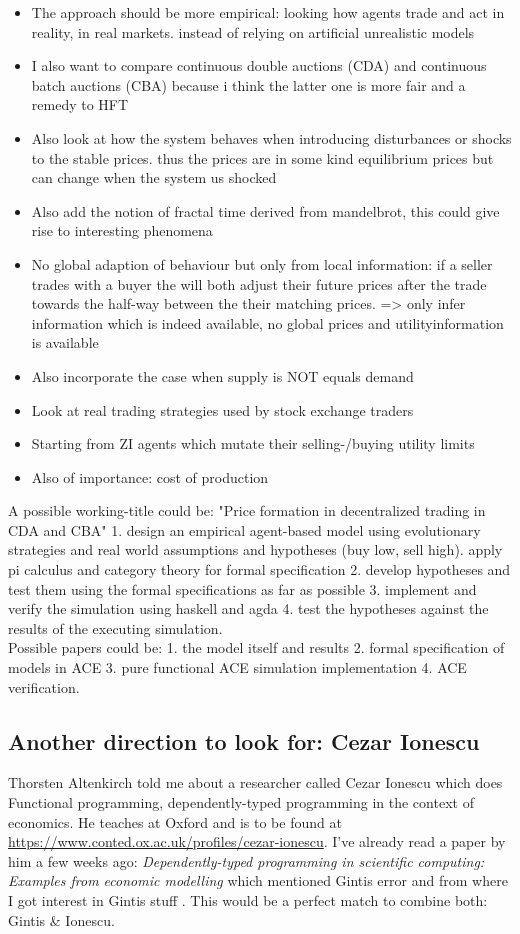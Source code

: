 \begin{itemize}
\item The approach should be more empirical: looking how agents trade and act in reality, in real markets. instead of relying on artificial unrealistic models
\item I also want to compare continuous double auctions (CDA) and continuous batch auctions (CBA) because i think the latter one is more fair and a remedy to HFT
\item Also look at how the system behaves when introducing disturbances or shocks to the stable prices. thus the prices are in some kind equilibrium prices but can change when the system us shocked
\item Also add the notion of fractal time derived from mandelbrot, this could give rise to interesting phenomena
\item No global adaption of behaviour but only from local information: if a seller trades with a buyer the will both adjust their future prices after the trade towards the half-way between the their matching prices. => only infer information which is indeed available, no global prices and utilityinformation is available
\item Also incorporate the case when supply is NOT equals demand
\item Look at real trading strategies used by stock exchange traders
\item Starting from ZI agents which mutate their selling-/buying utility limits
\item Also of importance: cost of production
\end{itemize}

A possible working-title could be: "Price formation in decentralized trading in CDA and CBA" 1. design an empirical agent-based model using evolutionary strategies and real world assumptions and hypotheses (buy low, sell high). apply pi calculus and category theory for formal specification 2. develop hypotheses and test them using the formal specifications as far as possible 3. implement and verify the simulation using haskell and agda 4. test the hypotheses against the results of the executing simulation. \\ Possible papers could be: 1. the model itself and results 2. formal specification of models in ACE 3. pure functional ACE simulation implementation 4. ACE verification.

\subsection*{Another direction to look for: Cezar Ionescu}
Thorsten Altenkirch told me about a researcher called Cezar Ionescu which does Functional programming, dependently-typed programming in the context of economics. He teaches at Oxford and is to be found at \url{https://www.conted.ox.ac.uk/profiles/cezar-ionescu}. I've already read a paper by him a few weeks ago: \textit{Dependently-typed programming in scientific computing: Examples from economic modelling} \cite{Ionescu2013} which mentioned Gintis error and from where I got interest in Gintis stuff \cite{Gintis2006}. This would be a perfect match to combine both: Gintis \& Ionescu.

